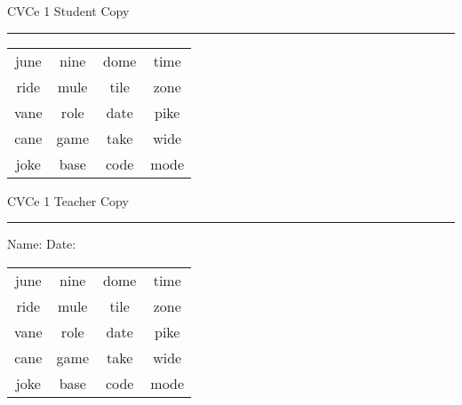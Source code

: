 \documentclass{memoir}
\begin{document}

\footnotesize \noindent
CVCe 1 \hfill Student Copy
\smallskip
\hrule

\Large

\setlength{\tabcolsep}{14pt}
\def\arraystretch{2}

{\selectfont


\begin{vplace}[0.5]
\begin{center}
\begin{tabular}{cccc}
june & nine & dome & time \\
ride & mule & tile & zone \\
vane & role & date & pike \\
cane & game & take & wide \\
joke & base & code & mode \\
\end{tabular}
\end{center}
\end{vplace}

}

\newpage

\footnotesize \noindent
CVCe 1 \hfill Teacher Copy
\smallskip
\hrule

\small

\vfill

\noindent
Name: \underline{\hspace{1.75in}} \hfill Date: \underline{\hspace{1in}}

\Large

{\selectfont


\begin{vplace}[0.5]
\begin{center}
\begin{tabular}{cccc}
june & nine & dome & time \\
ride & mule & tile & zone \\
vane & role & date & pike \\
cane & game & take & wide \\
joke & base & code & mode \\
\end{tabular}
\end{center}
\end{vplace}



}
\end{document}
